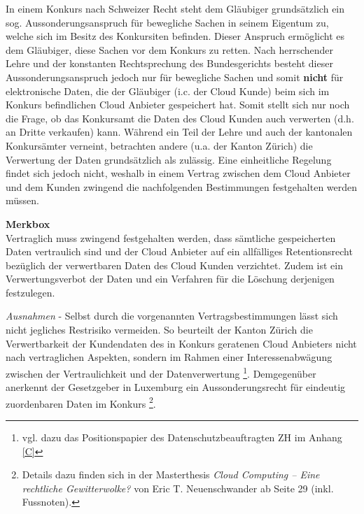 \documentclass[a4paper,pointlessnumbers]{scrreprt}
\newcommand{\merkbox}[2][0.8\textwidth]{ \begin{center} \begin{tcolorbox}[enhanced, drop fuzzy midday shadow, width={#1}, opacityframe=0.5, colframe=BrickRed, colback=white] {\ECFTeenSpirit \color{BrickRed}\textbf{Merkbox} \qquad {\tiny das gilt es zu beachten}} \\  #2 \end{tcolorbox} \end{center}}
\begin{document}
In einem Konkurs nach Schweizer Recht steht dem Gläubiger grundsätzlich ein sog. Aussonderungsanspruch für bewegliche Sachen in seinem Eigentum zu, welche sich im Besitz des Konkursiten befinden. Dieser Anspruch ermöglicht es dem Gläubiger, diese Sachen vor dem Konkurs zu retten. Nach herrschender Lehre und der konstanten Rechtsprechung des Bundesgerichts besteht dieser Aussonderungsanspruch jedoch nur für bewegliche Sachen und somit \textbf{nicht} für elektronische Daten, die der Gläubiger (i.c. der Cloud Kunde) beim sich im Konkurs befindlichen Cloud Anbieter gespeichert hat. Somit stellt sich nur noch die Frage, ob das Konkursamt die Daten des Cloud Kunden auch verwerten (d.h. an Dritte verkaufen) kann. Während ein Teil der Lehre und auch der kantonalen Konkursämter verneint, betrachten andere (u.a. der Kanton Zürich) die Verwertung der Daten grundsätzlich als zulässig. Eine einheitliche Regelung findet sich jedoch nicht, weshalb in einem Vertrag zwischen dem Cloud Anbieter und dem Kunden zwingend die nachfolgenden Bestimmungen festgehalten werden müssen.

\merkbox[0.7\textwidth]{Vertraglich muss zwingend festgehalten werden, dass sämtliche gespeicherten Daten vertraulich sind und der Cloud Anbieter auf ein allfälliges Retentionsrecht bezüglich der verwertbaren Daten des Cloud Kunden verzichtet. Zudem ist ein Verwertungsverbot der Daten und ein Verfahren für die Löschung derjenigen festzulegen.}

\textit{Ausnahmen} - Selbst durch die vorgenannten Vertragsbestimmungen lässt sich nicht jegliches Restrisiko vermeiden. So beurteilt der Kanton Zürich die Verwertbarkeit der Kundendaten des in Konkurs geratenen Cloud Anbieters nicht nach vertraglichen Aspekten, sondern im Rahmen einer Interessenabwägung zwischen der Vertraulichkeit und der Datenverwertung \footnote{vgl. dazu das Positionspapier des Datenschutzbeauftragten ZH im Anhang \ref{C}}. Demgegenüber anerkennt der Gesetzgeber in Luxemburg ein Aussonderungsrecht für eindeutig zuordenbaren Daten im Konkurs \footnote{Details dazu finden sich in der Masterthesis \textit{Cloud Computing – Eine rechtliche Gewitterwolke?} von Eric T. Neuenschwander ab Seite 29 (inkl. Fussnoten).}.
\end{document}

